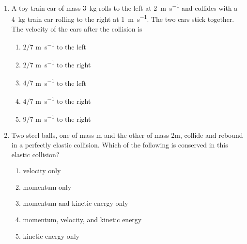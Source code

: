 \documentclass{../../../oss-apphys}
\begin{document}
\genheader


\genmultidirections

\gengravity

\raggedcolumns
\begin{multicols}{2}

  \begin{enumerate}[leftmargin=18pt]

  \item A toy train car of mass \SI{3}{\kilo\gram} rolls to the left at
    \SI{2}{\metre\per\second} and collides with a \SI{4}{\kilo\gram} train
    car rolling to the right at \SI{1}{\metre\per\second}. The two cars stick
    together. The velocity of the cars after the collision is
    \begin{enumerate}[noitemsep,topsep=0pt,leftmargin=18pt,label=(\Alph*)]
    \item $2/7$ \si{\metre\per\second} to the left
    \item $2/7$ \si{\metre\per\second} to the right
    \item $4/7$ \si{\metre\per\second} to the left
    \item $4/7$ \si{\metre\per\second} to the right
    \item $9/7$ \si{\metre\per\second} to the right
    \end{enumerate}
    
  \item Two steel balls, one of mass m and the other of mass 2m, collide and
    rebound in a perfectly elastic collision. Which of the following is
    conserved in this elastic collision?
    \begin{enumerate}[noitemsep,topsep=0pt,leftmargin=18pt,label=(\Alph*)]
    \item velocity only
    \item momentum only
    \item momentum and kinetic energy only
    \item momentum, velocity, and kinetic energy
    \item kinetic energy only
    \end{enumerate}
    

\end{enumerate}
\end{multicols}
\end{document}
